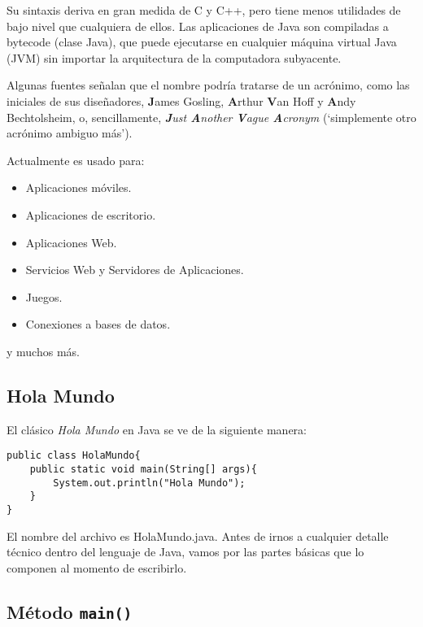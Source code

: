 \documentclass[12pt]{article}
\theoremstyle{largebreak}
\begin{document}
    Su sintaxis deriva en gran medida de C y C++, pero tiene menos utilidades de bajo nivel que cualquiera de ellos. Las aplicaciones de Java son compiladas a bytecode (clase Java), que puede ejecutarse en cualquier máquina virtual Java (JVM) sin importar la arquitectura de la computadora subyacente.

    \begin{obs}
        Algunas fuentes señalan que el nombre podría tratarse de un acrónimo, como las iniciales de sus diseñadores, \textbf{J}ames Gosling, \textbf{A}rthur \textbf{V}an Hoff y \textbf{A}ndy Bechtolsheim, o, sencillamente, \textit{\textbf{J}ust \textbf{A}nother \textbf{V}ague \textbf{A}cronym} (‘simplemente otro acrónimo ambiguo más’).
    \end{obs}

    Actualmente es usado para:
    \begin{itemize}
        \item Aplicaciones móviles.
        \item Aplicaciones de escritorio.
        \item Aplicaciones Web.
        \item Servicios Web y Servidores de Aplicaciones.
        \item Juegos.
        \item Conexiones a bases de datos.
    \end{itemize}
    y muchos más.
    
    \subsection{Hola Mundo}

    El clásico \textit{Hola Mundo} en Java se ve de la siguiente manera:

    \begin{lstlisting}[caption={Hola Mundo.},label=DescriptiveLabel]
public class HolaMundo{
    public static void main(String[] args){
        System.out.println("Hola Mundo");
    }
}
    \end{lstlisting}

    El nombre del archivo es HolaMundo.java. Antes de irnos a cualquier detalle técnico dentro del lenguaje de Java, vamos por las partes básicas que lo componen al momento de escribirlo.

    \subsection{Método \lstinline|main()|}
\end{document}
